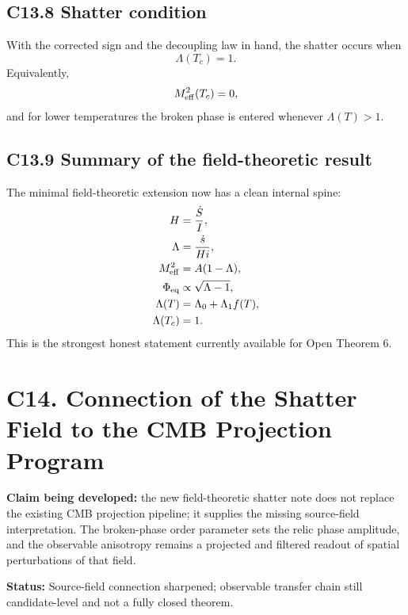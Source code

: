 \documentclass[11pt]{article}
\newcommand{\status}[1]{\textcolor{accent}{\textbf{Status:}} #1}
\begin{document}
\subsection*{C13.8 Shatter condition}
With the corrected sign and the decoupling law in hand, the shatter occurs when
\begin{equation}
\boxed{\Lambda(T_c)=1.}
\end{equation}
Equivalently,
\begin{equation}
M_{\rm eff}^2(T_c)=0,
\end{equation}
and for lower temperatures the broken phase is entered whenever $\Lambda(T)>1$.

\subsection*{C13.9 Summary of the field-theoretic result}
The minimal field-theoretic extension now has a clean internal spine:
\begin{align}
H &= \frac{\dot S}{I},\\
\Lambda &= \frac{\dot s}{Hi},\\
M_{\rm eff}^2 & = A(1-\Lambda),\\
\Phi_{\rm eq} &\propto \sqrt{\Lambda-1},\\
\Lambda(T) &= \Lambda_0+\Lambda_1 f(T),\\
\Lambda(T_c)&=1.
\end{align}
This is the strongest honest statement currently available for Open Theorem 6.

\section*{C14. Connection of the Shatter Field to the CMB Projection Program}
\textcolor{accent}{\textbf{Claim being developed:}} the new field-theoretic shatter note does not replace the existing CMB projection pipeline; it supplies the missing source-field interpretation. The broken-phase order parameter sets the relic phase amplitude, and the observable anisotropy remains a projected and filtered readout of spatial perturbations of that field.

\status{Source-field connection sharpened; observable transfer chain still candidate-level and not a fully closed theorem.}
\end{document}
